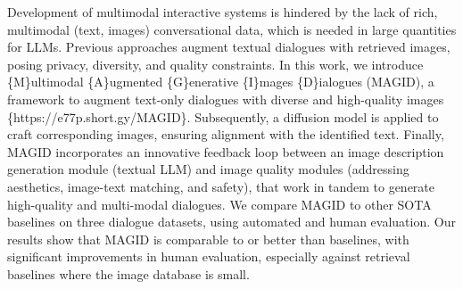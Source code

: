 Development of multimodal interactive systems is hindered by the lack of rich, multimodal (text, images) conversational data, which is needed in large quantities for LLMs. Previous approaches augment textual dialogues with retrieved images, posing privacy, diversity, and quality constraints. In this work, we introduce \{M\}ultimodal \{A\}ugmented \{G\}enerative \{I\}mages \{D\}ialogues (MAGID), a framework to augment text-only dialogues with diverse and high-quality images \{https://e77p.short.gy/MAGID\}. Subsequently, a diffusion model is applied to craft corresponding images, ensuring alignment with the identified text. Finally, MAGID incorporates an innovative feedback loop between an image description generation module (textual LLM) and image quality modules (addressing aesthetics, image-text matching, and safety), that work in tandem to generate high-quality and multi-modal dialogues. We compare MAGID to other SOTA baselines on three dialogue datasets, using automated and human evaluation. Our results show that MAGID is comparable to or better than baselines, with significant improvements in human evaluation, especially against retrieval baselines where the image database is small.